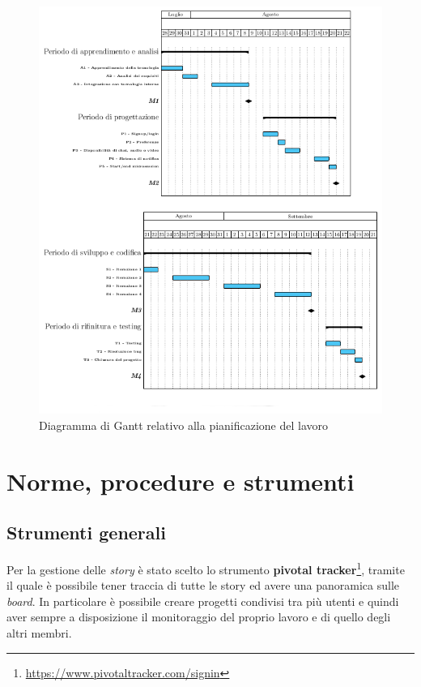\begin{figure}[htpd]
\centering
\includegraphics[width=\textwidth]{../immagini/gantt}
\caption{Diagramma di Gantt relativo alla pianificazione del lavoro}  
\end{figure}

\section{Norme, procedure e strumenti}

\subsection*{Strumenti generali}

Per la gestione delle \textit{story} è stato scelto lo strumento \textbf{pivotal tracker}\footnote{\url{https://www.pivotaltracker.com/signin}}, tramite il quale è possibile tener traccia di tutte le story ed avere una panoramica sulle \textit{board}. In particolare è possibile creare progetti condivisi tra più utenti e quindi aver sempre a disposizione il monitoraggio del proprio lavoro e di quello degli altri membri.

